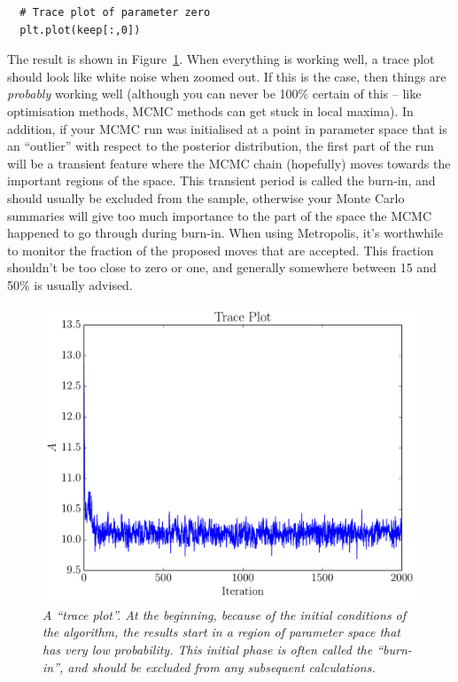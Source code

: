 \begin{verbatim}
  # Trace plot of parameter zero
  plt.plot(keep[:,0])
\end{verbatim}
The result is shown in Figure~\ref{fig:trace_plot}. When everything is working
well, a trace plot should look like white noise when zoomed out. If this is the
case, then things are {\it probably} working well (although you can never be
100\% certain of this -- like optimisation methods, MCMC methods can get
stuck in local maxima). In addition, if your MCMC run was initialised at a
point in parameter space that is an ``outlier'' with respect to the posterior
distribution, the first part of the run will be a transient feature where the
MCMC chain (hopefully) moves towards the important regions of the space.
This transient period is called the burn-in, and should usually be excluded
from the sample, otherwise your Monte Carlo summaries will give too much
importance to the part of the space the MCMC happened to go through during
burn-in. When using Metropolis, it's worthwhile to monitor the fraction of the proposed
moves that are accepted. This fraction shouldn't be too close to zero or one,
and generally somewhere between 15 and 50\% is usually advised.

\begin{figure}
\begin{center}
\includegraphics[scale=0.45]{trace_plot.pdf}
\caption{\it A ``trace plot''. At the beginning, because of the initial conditions
of the algorithm, the results start in a region of parameter space that has
very low probability. This initial phase is often called the ``burn-in'', and
should be excluded from any subsequent calculations.\label{fig:trace_plot}}
\end{center}
\end{figure}

